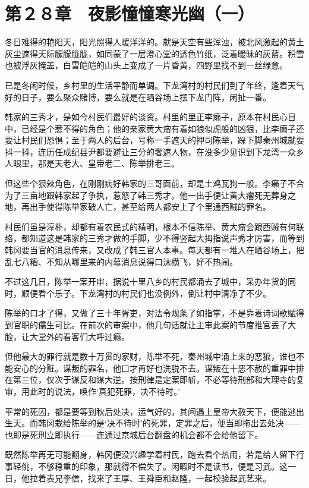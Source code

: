 \section{第２８章　夜影憧憧寒光幽（一）}

冬日难得的艳阳天，阳光照得人暖洋洋的。就是天空有些浑浊，被北风激起的黄土灰尘遮得天际朦朦胧胧，如同蒙了一层澄心堂的透色竹纸，泛着暧昧的灰蓝。积雪也被浮灰掩盖，白雪皑皑的山头上变成了一片昏黄，四野里找不到一丝绿意。

已是冬闲时候，乡村里的生活平静而单调。下龙湾村的村民们到了年终，逢着天气好的日子，要么聚众赌博，要么就是在晒谷场上摆下龙门阵，闲扯一番。

韩家的三秀才，是如今村民们最好的谈资。村里的里正李癞子，原本在村民心目中，已经是个惹不得的角色；他的亲家黄大瘤有着如狼似虎般的凶狠，比李癞子还要让村民们恐惧；至于两人的后台，号称一手遮天的押司陈举，跺下脚秦州城就要抖一抖，连历任成纪县尹都要避让三分的奢遮人物，在没多少见识到下龙湾一众乡人眼里，那是天老大、皇帝老二、陈举排老三。

但这些个狠辣角色，在刚刚病好韩家的三哥面前，却是土鸡瓦狗一般。李癞子不合为了三亩地跟韩家起了争执，惹怒了韩三秀才。他一出手便让黄大瘤死无葬身之地，再出手使得陈举家破人亡，甚至给两人都安上了个里通西贼的罪名。

村民们虽是淳朴，却都有着农民式的精明，根本不信陈举、黄大瘤会跟西贼有何联络，都知道这是韩家的三秀才做的手脚，少不得竖起大拇指说声秀才厉害，而等到韩冈要当官的消息传来，又改成了韩三官人本事。每天都有一堆人在晒谷场上，把乱七八糟、不知从哪里来的内幕消息说得口沫横飞，好不热闹。

不过这几日，陈举一案开审，据说十里八乡的村民都涌去了城中，采办年货的同时，顺便看个乐子。下龙湾村的村民们也没例外，倒让村中清净了不少。

陈举的口才了得，又做了三十年胥吏，对法令规条了如指掌，不是靠着诗词歌赋得到官职的儒生可比。在前次的审案中，他几句话就让主审此案的节度推官丢了大脸，让大堂外的看客们大呼过瘾。

但他最大的罪行就是数十万贯的家财，陈举不死，秦州城中涌上来的恶狼，谁也不能安心的分赃。谋叛的罪名，他口才再好也洗脱不去。谋叛在十恶不赦的重罪中排在第三位，仅次于谋反和谋大逆。按刑律是定案即斩，不必等待刑部和大理寺的复审，用此时的说法，唤作‘真犯死罪，决不待时。’

平常的死囚，都是要等到秋后处决，运气好的，其间遇上皇帝大赦天下，便能逃出生天。而韩冈栽给陈举的是‘决不待时’的死罪，定罪之后，便当即拖出去处决——也即是死刑立即执行——连通过京城后台翻盘的机会都不会给他留下。

既然陈举再无可能翻身，韩冈便没兴趣学着村民，跑去看个热闹，若是给人留下行事轻佻，不够稳重的印象，那就得不偿失了。闲暇时不是读书，便是习武。这一日，他拉着表兄李信，找来了王厚、王舜臣和赵隆，一起校验起武艺来。

